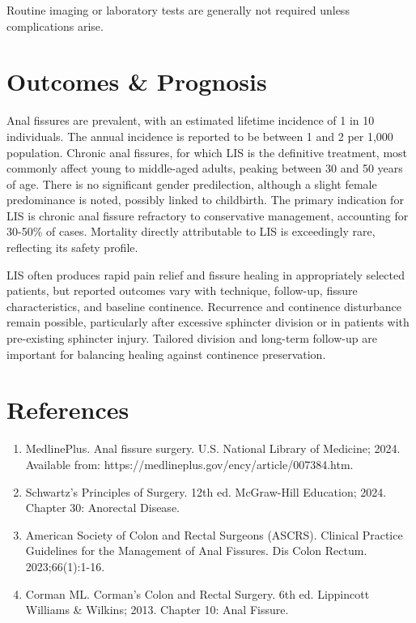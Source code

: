Routine imaging or laboratory tests are generally not required unless complications arise.

\section*{Outcomes \& Prognosis}
Anal fissures are prevalent, with an estimated lifetime incidence of 1 in 10 individuals. The annual incidence is reported to be between 1 and 2 per 1,000 population. Chronic anal fissures, for which LIS is the definitive treatment, most commonly affect young to middle-aged adults, peaking between 30 and 50 years of age. There is no significant gender predilection, although a slight female predominance is noted, possibly linked to childbirth. The primary indication for LIS is chronic anal fissure refractory to conservative management, accounting for 30-50\% of cases. Mortality directly attributable to LIS is exceedingly rare, reflecting its safety profile.

LIS often produces rapid pain relief and fissure healing in appropriately selected patients, but reported outcomes vary with technique, follow-up, fissure characteristics, and baseline continence. Recurrence and continence disturbance remain possible, particularly after excessive sphincter division or in patients with pre-existing sphincter injury. Tailored division and long-term follow-up are important for balancing healing against continence preservation.

\section*{References}
\begin{enumerate}
  \item MedlinePlus. Anal fissure surgery. U.S. National Library of Medicine; 2024. Available from: https://medlineplus.gov/ency/article/007384.htm.
  \item Schwartz's Principles of Surgery. 12th ed. McGraw-Hill Education; 2024. Chapter 30: Anorectal Disease.
  \item American Society of Colon and Rectal Surgeons (ASCRS). Clinical Practice Guidelines for the Management of Anal Fissures. Dis Colon Rectum. 2023;66(1):1-16.
  \item Corman ML. Corman's Colon and Rectal Surgery. 6th ed. Lippincott Williams \& Wilkins; 2013. Chapter 10: Anal Fissure.
\end{enumerate}

\clearpage

